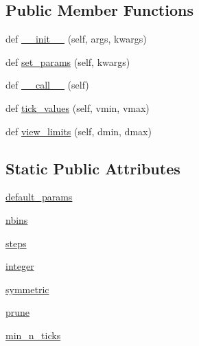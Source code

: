 \subsection*{Public Member Functions}
\begin{DoxyCompactItemize}
\item 
def \hyperlink{classmatplotlib_1_1ticker_1_1MaxNLocator_a3c8d49ff313ee77faaac42d5ed88c319}{\+\_\+\+\_\+init\+\_\+\+\_\+} (self, args, kwargs)
\item 
def \hyperlink{classmatplotlib_1_1ticker_1_1MaxNLocator_ad4fcbde5dafcc6b16f69aba87a8f0504}{set\+\_\+params} (self, kwargs)
\item 
def \hyperlink{classmatplotlib_1_1ticker_1_1MaxNLocator_ac25f6a562c7444d0f940fd1f5eccebae}{\+\_\+\+\_\+call\+\_\+\+\_\+} (self)
\item 
def \hyperlink{classmatplotlib_1_1ticker_1_1MaxNLocator_a522013809076312c55a3be93b20fa27f}{tick\+\_\+values} (self, vmin, vmax)
\item 
def \hyperlink{classmatplotlib_1_1ticker_1_1MaxNLocator_a24478e8039d21c7f85f4bf1221b58870}{view\+\_\+limits} (self, dmin, dmax)
\end{DoxyCompactItemize}
\subsection*{Static Public Attributes}
\begin{DoxyCompactItemize}
\item 
\hyperlink{classmatplotlib_1_1ticker_1_1MaxNLocator_ad19d15fa6f824f3c27756520c2fb9689}{default\+\_\+params}
\item 
\hyperlink{classmatplotlib_1_1ticker_1_1MaxNLocator_ab982e8cceb9cdf89f9ca4166729401f1}{nbins}
\item 
\hyperlink{classmatplotlib_1_1ticker_1_1MaxNLocator_a1011800698b63e9ac21d5a17f0457f42}{steps}
\item 
\hyperlink{classmatplotlib_1_1ticker_1_1MaxNLocator_a696ca1ea62afe2be0c3d15531f667f7b}{integer}
\item 
\hyperlink{classmatplotlib_1_1ticker_1_1MaxNLocator_ab502d1f9d20600eaec384145e1cfa055}{symmetric}
\item 
\hyperlink{classmatplotlib_1_1ticker_1_1MaxNLocator_ac7921df59e33758a4b9d6c6c3eef03fc}{prune}
\item 
\hyperlink{classmatplotlib_1_1ticker_1_1MaxNLocator_a57c6b351c1757ea6e53e14d2e5a4c4bb}{min\+\_\+n\+\_\+ticks}
\end{DoxyCompactItemize}



